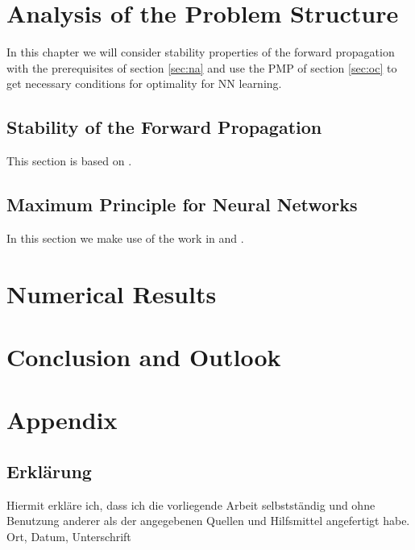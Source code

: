 \documentclass[a4paper, 12pt]{scrreprt} %
\begin{document}
\chapter{Analysis of the Problem Structure}
\label{chap:AotPS}
In this chapter we will consider stability properties of the forward propagation with the prerequisites of section \ref{sec:na} and use the \ac{PMP} of section \ref{sec:oc} to get necessary conditions for optimality for \ac{NN} learning.

\section{Stability of the Forward Propagation}
This section is based on \cite{safdnn}.


\section{Maximum Principle for Neural Networks}
In this section we make use of the work in \cite{aocatdl} and \cite{mpbafdl}.



\chapter{Numerical Results}
\label{chap:NR}



\chapter{Conclusion and Outlook}
\label{chap:CaO}

\clearpage
\appendix
\chapter{Appendix}


\clearpage



\newpage
\section*{Erklärung}		
\thispagestyle{empty}				


Hiermit erkläre ich, dass ich die vorliegende Arbeit selbstständig und ohne Benutzung anderer als der angegebenen Quellen und Hilfsmittel angefertigt habe.
\newline\newline
Ort, Datum, Unterschrift
\end{document}
